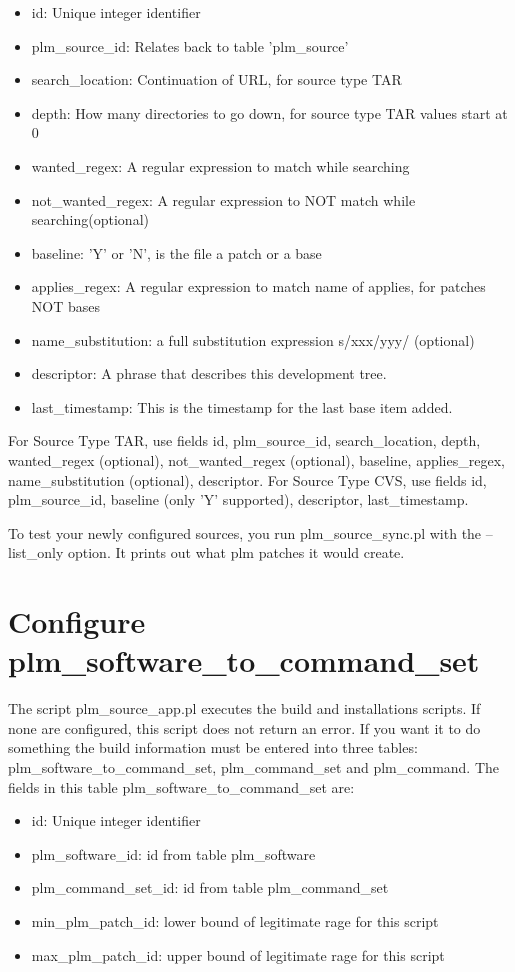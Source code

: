 \begin{itemize}
\item id: Unique integer identifier
\item plm\_source\_id:  Relates back to table 'plm\_source'
\item search\_location:  Continuation of URL, for source type TAR
\item depth: How many directories to go down, for source type TAR values start at 0
\item wanted\_regex: A regular expression to match while searching
\item not\_wanted\_regex: A regular expression to NOT match while searching(optional)
\item baseline: 'Y' or 'N', is the file a patch or a base 
\item applies\_regex: A regular expression to match name of applies, for patches NOT bases
\item name\_substitution: a full substitution expression s/xxx/yyy/ (optional)
\item descriptor: A phrase that describes this development tree.
\item last\_timestamp: This is the timestamp for the last base item added.
\end{itemize}


For Source Type TAR, use fields id, plm\_source\_id, search\_location, depth, wanted\_regex (optional), not\_wanted\_regex (optional), baseline, applies\_regex, name\_substitution (optional), descriptor.  For Source Type CVS, use fields id, plm\_source\_id, baseline (only 'Y' supported), descriptor, last\_timestamp. 

To test your newly configured sources, you run plm\_source\_sync.pl with the --list\_only option.  It prints out what plm patches it would create.

\section {Configure plm_software_to_command_set}
The script plm\_source\_app.pl executes the build and installations scripts.  If none are configured, this script does not return an error.  If you want it to do something the build information must be entered into three tables:  plm\_software\_to\_command\_set, plm\_command\_set and plm\_command.  The fields in this table plm\_software\_to\_command\_set are:

\begin{itemize}
\item id: Unique integer identifier
\item plm\_software\_id:  id from table plm\_software
\item plm\_command\_set\_id:  id from table plm\_command\_set
\item min\_plm\_patch\_id:  lower bound of legitimate rage for this script
\item max\_plm\_patch\_id:  upper bound of legitimate rage for this script
\end{itemize}



